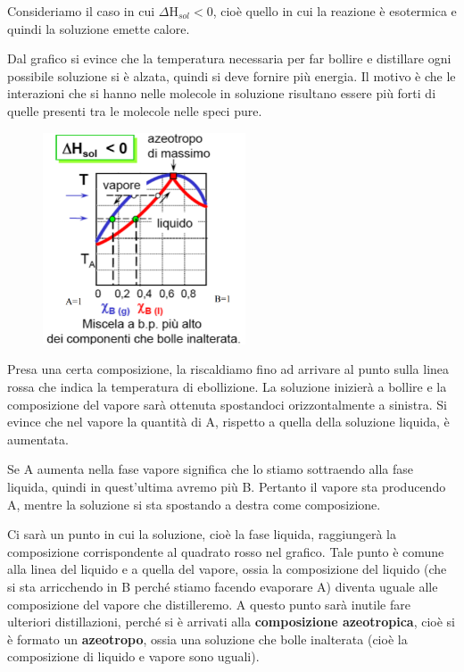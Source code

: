 \vspace{0.2cm}Consideriamo il caso in cui $\Delta$H$_{sol}$$<$0, cioè quello in cui la reazione è esotermica e quindi la soluzione emette calore.

Dal grafico si evince che la temperatura necessaria per far bollire e distillare ogni possibile soluzione si è alzata, quindi si deve fornire più energia. Il motivo è che le interazioni che si hanno nelle molecole in soluzione risultano essere più forti di quelle presenti tra le molecole nelle speci pure.

\begin{minipage}{0.4\textwidth}
    \begin{figure}[H]
        \includegraphics[width=6cm]{immagini/distillazione_esotermica.png}
    \end{figure}
\end{minipage}
\begin{minipage}{0.6\textwidth}
    \vspace{0.6cm}Presa una certa composizione, la riscaldiamo fino ad arrivare al punto sulla linea rossa che indica la temperatura di ebollizione. La soluzione inizierà a bollire e la composizione del vapore sarà ottenuta spostandoci orizzontalmente a sinistra. Si evince che nel vapore la quantità di A, rispetto a quella della soluzione liquida, è aumentata.

    Se A aumenta nella fase vapore significa che lo stiamo sottraendo alla fase liquida, quindi in quest'ultima avremo più B. Pertanto il vapore sta producendo A, mentre la soluzione si sta spostando a destra come composizione.
\end{minipage}

\vspace{0.3cm}Ci sarà un punto in cui la soluzione, cioè la fase liquida, raggiungerà la composizione corrispondente al quadrato rosso nel grafico. Tale punto è comune alla linea del liquido e a quella del vapore, ossia la composizione del liquido (che si sta arricchendo in B perché stiamo facendo evaporare A) diventa uguale alle composizione del vapore che distilleremo. A questo punto sarà inutile fare ulteriori distillazioni, perché si è arrivati alla \textbf{composizione azeotropica}, cioè si è formato un \textbf{azeotropo}, ossia una soluzione che bolle inalterata (cioè la composizione di liquido e vapore sono uguali).

